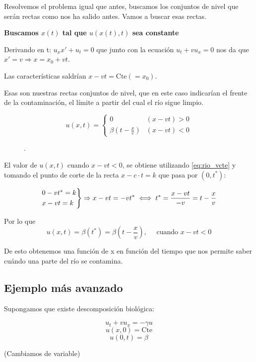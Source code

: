 		Resolvemos el problema igual que antes, buscamos los conjuntos de nivel que serán rectas como nos ha salido antes. Vamos a buscar esas rectas.

		\textbf{Buscamos $x(t)$ tal que $u(x(t),t)$ sea constante}

		Derivando en t: $u_x x' + u_t = 0$ que junto con la ecuación $u_t + v u_x = 0$ nos da que $x' = v \Rightarrow x = x_0 + vt $.

		Las características saldrían \(x-vt = \text{Cte}(=x_0) \label{eq:rio_vcte}\).

		Esas son nuestras rectas conjuntos de nivel, que en este caso indicarían el frente de la contaminación, el límite a partir del cual el río sigue limpio.

		$$u(x,t) =
			\begin{cases}
				0                      & (x-vt) > 0 \\
				\beta(t - \frac{x}{v}) & (x-vt) < 0
			\end{cases}
		$$

		\begin{figure}[hbtp]
			\centering
			\caption{}.
			\label{fig:ContaminacionRio}
		\end{figure}

		El valor de $u(x,t)$ cuando $x-vt < 0$, se obtiene utilizando \ref{eq:rio_vcte} y tomando el punto de corte de la recta $x-c \cdot t=k$ que pasa por $(0,t^*)$:

		$$
		\begin{rcases}
			0 - vt^{*} = k \\
			x - vt = k
		\end{rcases}
		 \Rightarrow x-vt = -vt^{*} \iff t^* = \frac{x-vt}{-v} = t - \frac{x}{v}$$

		Por lo que
		$$u(x,t) = \beta(t^*) = \beta(t - \frac{x}{v}), \quad \text{ cuando } x - vt < 0$$

		De esto obtenemos una función de x en función del tiempo que nos permite saber cuándo una parte del río se contamina.

	\subsection{Ejemplo más avanzado}

		Supongamos que existe descomposición biológica:

		$$u_t + vu_x = -\gamma u$$
		$$u(x,0) = \text{Cte}$$
		$$u(0,t) = \beta$$

		(Cambiamos de variable)

